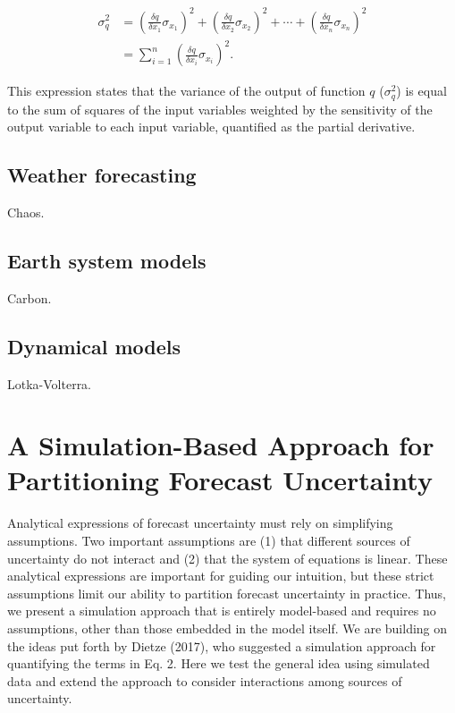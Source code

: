 \documentclass[12pt,]{article}
\begin{document}
\begin{align}
\sigma^2_q &= \left( \frac{\delta q}{\delta x_1} \sigma_{x_1} \right)^2 + \left( \frac{\delta q}{\delta x_2} \sigma_{x_2} \right)^2 + \cdots + \left( \frac{\delta q}{\delta x_n} \sigma_{x_n} \right)^2 \\
&= \sum^n_{i=1}\left( \frac{\delta q}{\delta x_i} \sigma_{x_i} \right)^2.
\end{align}

\noindent{}This expression states that the variance of the output of
function \(q\) (\(\sigma^2_q\)) is equal to the sum of squares of the
input variables weighted by the sensitivity of the output variable to
each input variable, quantified as the partial derivative.

\hypertarget{weather-forecasting}{%
\subsection{Weather forecasting}\label{weather-forecasting}}

Chaos.

\hypertarget{earth-system-models}{%
\subsection{Earth system models}\label{earth-system-models}}

Carbon.

\hypertarget{dynamical-models}{%
\subsection{Dynamical models}\label{dynamical-models}}

Lotka-Volterra.

\hypertarget{a-simulation-based-approach-for-partitioning-forecast-uncertainty}{%
\section{A Simulation-Based Approach for Partitioning Forecast
Uncertainty}\label{a-simulation-based-approach-for-partitioning-forecast-uncertainty}}

Analytical expressions of forecast uncertainty must rely on simplifying
assumptions. Two important assumptions are (1) that different sources of
uncertainty do not interact and (2) that the system of equations is
linear. These analytical expressions are important for guiding our
intuition, but these strict assumptions limit our ability to partition
forecast uncertainty in practice. Thus, we present a simulation approach
that is entirely model-based and requires no assumptions, other than
those embedded in the model itself. We are building on the ideas put
forth by Dietze (2017), who suggested a simulation approach for
quantifying the terms in Eq. 2. Here we test the general idea using
simulated data and extend the approach to consider interactions among
sources of uncertainty.
\end{document}
